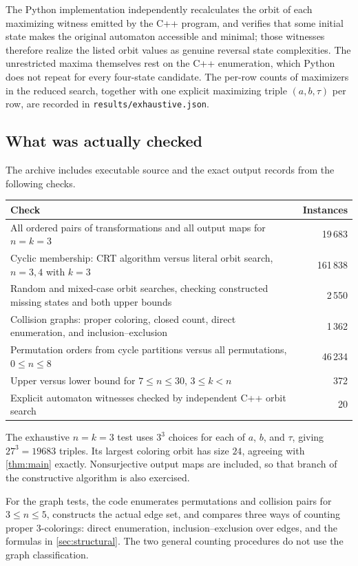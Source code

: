 \documentclass[11pt,a4paper]{article}
\numberwithin{equation}{section}
\theoremstyle{definition}
\theoremstyle{remark}
\begin{document}
The Python implementation independently recalculates the orbit of each
maximizing witness emitted by the C++ program, and verifies that some initial
state makes the original automaton accessible and minimal; those witnesses
therefore realize the listed orbit values as genuine reversal state
complexities. The unrestricted maxima themselves rest on the C++
enumeration, which Python does not repeat for every four-state candidate.
The per-row counts of maximizers in the reduced search, together with one
explicit maximizing triple $(a,b,\tau)$ per row, are recorded in
\texttt{results/exhaustive.json}.

\subsection{What was actually checked}

The archive includes executable source and the exact output records from the
following checks.
\begin{center}
\begin{tabular}{@{}p{}r@{}}
\toprule
Check & Instances\\
\midrule
All ordered pairs of transformations and all output maps for $n=k=3$ & 19\,683\\
Cyclic membership: CRT algorithm versus literal orbit search,
$n=3,4$ with $k=3$ & 161\,838\\
Random and mixed-case orbit searches, checking constructed missing states
and both upper bounds & 2\,550\\
Collision graphs: proper coloring, closed count, direct enumeration,
and inclusion--exclusion & 1\,362\\
Permutation orders from cycle partitions versus all permutations,
$0\le n\le8$ & 46\,234\\
Upper versus lower bound for $7\le n\le30$, $3\le k<n$ & 372\\
Explicit automaton witnesses checked by independent C++ orbit search & 20\\
\bottomrule
\end{tabular}
\end{center}

The exhaustive $n=k=3$ test uses $3^3$ choices for each of $a$, $b$, and
$\tau$, giving $27^3=19683$ triples. Its largest coloring orbit has size
$24$, agreeing with \cref{thm:main} exactly. Nonsurjective output maps are
included, so that branch of the constructive algorithm is also exercised.

For the graph tests, the code enumerates permutations and collision pairs
for $3\le n\le5$, constructs the actual edge set, and compares three ways
of counting proper $3$-colorings: direct enumeration, inclusion--exclusion
over edges, and the formulas in \cref{sec:structural}. The two general
counting procedures do not use the graph classification.
\end{document}

